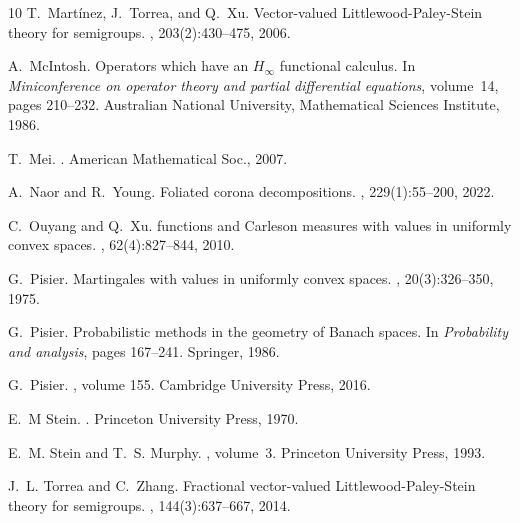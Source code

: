\documentclass[oneside,english,a4wide]{amsart}
\numberwithin{equation}{section}
\numberwithin{figure}{section}
\theoremstyle{plain}
\theoremstyle{plain}
\theoremstyle{definition}
\theoremstyle{plain}
\theoremstyle{remark}
\theoremstyle{definition}
\theoremstyle{remark}
\theoremstyle{definition}
\newcommand{\8}{+\infty}
\renewcommand{\1}{\mathbbm{1}}
\begin{document}
{\begin{thebibliography}{10}
    T.~Mart{\'i}nez, J.~Torrea, and Q.~Xu.
    \newblock Vector-valued {L}ittlewood-{P}aley-{S}tein theory for semigroups.
    , 203(2):430--475, 2006.
    
    A.~McIntosh.
    \newblock Operators which have an $ {H}_{\infty}$ functional calculus.
    \newblock In {\em Miniconference on operator theory and partial differential
      equations}, volume~14, pages 210--232. Australian National University,
      Mathematical Sciences Institute, 1986.
    
    T.~Mei.
    .
    \newblock American Mathematical Soc., 2007.
    
    A.~Naor and R.~Young.
    \newblock Foliated corona decompositions.
    , 229(1):55--200, 2022.
    
    C.~Ouyang and Q.~Xu.
     functions and {C}arleson measures with values in uniformly
      convex spaces.
    , 62(4):827--844, 2010.
    
    G.~Pisier.
    \newblock Martingales with values in uniformly convex spaces.
    , 20(3):326--350, 1975.
    
    G.~Pisier.
    \newblock Probabilistic methods in the geometry of {B}anach spaces.
    \newblock In {\em Probability and analysis}, pages 167--241. Springer, 1986.
    
    G.~Pisier.
    , volume 155.
    \newblock Cambridge University Press, 2016.
    
    E.~M Stein.
    .
    \newblock Princeton University Press, 1970.
    
    E.~M. Stein and T.~S. Murphy.
    , volume~3.
    \newblock Princeton University Press, 1993.
    
    J.~L. Torrea and C.~Zhang.
    \newblock Fractional vector-valued {L}ittlewood-{P}aley-{S}tein theory for
      semigroups.
    , 144(3):637--667, 2014.
    

\end{thebibliography}}
\end{document}
